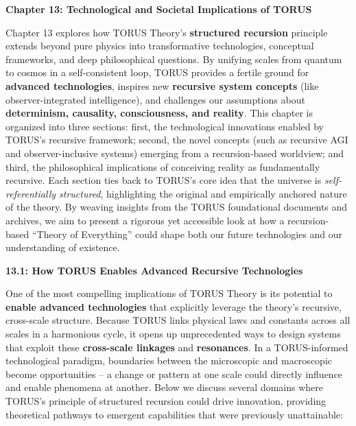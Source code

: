 \documentclass[]{article}
\date{}
\begin{document}
\textbf{Chapter 13: Technological and Societal Implications of TORUS}

Chapter 13 explores how TORUS Theory's \textbf{structured recursion}
principle extends beyond pure physics into transformative technologies,
conceptual frameworks, and deep philosophical questions. By unifying
scales from quantum to cosmos in a self-consistent loop, TORUS provides
a fertile ground for \textbf{advanced technologies}, inspires new
\textbf{recursive system concepts} (like observer-integrated
intelligence), and challenges our assumptions about \textbf{determinism,
causality, consciousness, and reality}. This chapter is organized into
three sections: first, the technological innovations enabled by TORUS's
recursive framework; second, the novel concepts (such as recursive AGI
and observer-inclusive systems) emerging from a recursion-based
worldview; and third, the philosophical implications of conceiving
reality as fundamentally recursive. Each section ties back to TORUS's
core idea that the universe is \emph{self-referentially structured},
highlighting the original and empirically anchored nature of the theory.
By weaving insights from the TORUS foundational documents and archives,
we aim to present a rigorous yet accessible look at how a
recursion-based ``Theory of Everything'' could shape both our future
technologies and our understanding of existence.

\textbf{13.1: How TORUS Enables Advanced Recursive Technologies}

One of the most compelling implications of TORUS Theory is its potential
to \textbf{enable advanced technologies} that explicitly leverage the
theory's recursive, cross-scale structure. Because TORUS links physical
laws and constants across all scales in a harmonious cycle, it opens up
unprecedented ways to design systems that exploit these
\textbf{cross-scale linkages} and \textbf{resonances}. In a
TORUS-informed technological paradigm, boundaries between the
microscopic and macroscopic become opportunities -- a change or pattern
at one scale could directly influence and enable phenomena at another.
Below we discuss several domains where TORUS's principle of structured
recursion could drive innovation, providing theoretical pathways to
emergent capabilities that were previously unattainable:
\end{document}
